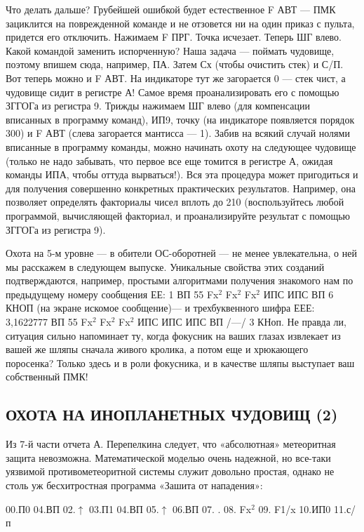 \documentclass[11pt,a4paper,oneside]{article}
\begin{document}
Что делать дальше? Грубейшей ошибкой будет естественное F АВТ — ПМК зациклится на поврежденной команде и не отзовется ни на один приказ с пульта, придется его отключить. Нажимаем F ПРГ. Точка исчезает. Теперь ШГ влево. Какой командой заменить испорченную? Наша задача — поймать чудовище, поэтому впишем сюда, например, ПА. Затем Сх (чтобы очистить стек) и С/П. Вот теперь можно и F АВТ. На индикаторе тут же загорается 0 — стек чист, а чудовище сидит в регистре А! Самое время проанализировать его с помощью ЗГГОГа из регистра 9. Трижды нажимаем ШГ влево (для компенсации вписанных в программу команд), ИП9, точку (на индикаторе появляется порядок 300) и F АВТ (слева загорается мантисса — 1). Забив на всякий случай нолями вписанные в программу команды, можно начинать охоту на следующее чудовище (только не надо забывать, что первое все еще томится в регистре А, ожидая команды ИПА, чтобы оттуда вырваться!). Вся эта процедура может пригодиться и для получения совершенно конкретных практических результатов. Например, она позволяет определять факториалы чисел вплоть до 210 (воспользуйтесь любой программой, вычисляющей факториал, и проанализируйте результат с помощью ЗГГОГа из регистра 9).

Охота на 5-м уровне — в обители ОС-оборотней — не менее увлекательна, о ней мы расскажем в следующем выпуске. Уникальные свойства этих созданий подтверждаются, например, простыми алгоритмами получения знакомого нам по предыдущему номеру сообщения ЕЕ: 1 ВП 55 Fx$^{2}$ Fx$^{2}$ Fx$^{2}$ ИПС ИПС ВП 6 КНОП (на экране искомое сообщение)— и трехбуквенного шифра ЕЕЕ: 3,1622777 ВП 55 Fx$^{2}$ Fx$^{2}$ Fx$^{2}$ ИПС ИПС ИПС ВП /—/ 3 КНоп. Не правда ли, ситуация сильно напоминает ту, когда фокусник на ваших глазах извлекает из вашей же шляпы сначала живого кролика, а потом еще и хрюкающего поросенка? Только здесь и в роли фокусника, и в качестве шляпы выступает ваш собственный ПМК!

\subsection{ОХОТА НА ИНОПЛАНЕТНЫХ ЧУДОВИЩ (2)}
Из 7-й части отчета А. Перепелкина следует, что «абсолютная» метеоритная защита невозможна. Математической моделью очень надежной, но все-таки уязвимой противометеоритной системы служит довольно простая, однако не столь уж бесхитростная программа «Зашита от нападения»:

00.П0 04.ВП 02.$\uparrow$ 03.П1 04.ВП 05.$\uparrow$ 06.ВП 07. . 08. Fx$^{2}$ 09. F1/x 10.ИП0 11.с/п
\end{document}
